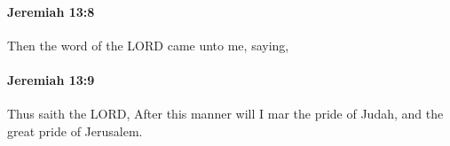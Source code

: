 		\paragraph{Jeremiah 13:8} %
			\label{JEREMIAH-13-8}

			Then the word of the LORD came unto me, saying,


		\paragraph{Jeremiah 13:9} %
			\label{JEREMIAH-13-9}

			Thus saith the LORD, After this manner will I mar the pride of Judah, and the great pride of Jerusalem.


